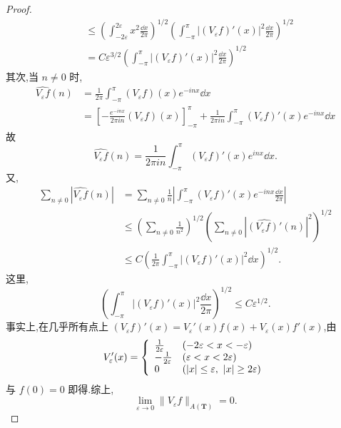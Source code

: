 \begin{proof}
\begin{align*}
& \leq \left(\int_{-2\varepsilon}^{2\varepsilon}x^{2}\frac{\dd x}{2\pi}\right)^{1/2}\left(\int_{-\pi}^{\pi}\left|(V_{\varepsilon}f)'(x)\right|^{2}\frac{\dd x}{2\pi}\right)^{1/2} \\
& = C\varepsilon^{3/2}\left(\int_{-\pi}^{\pi}\left|(V_{\varepsilon}f)'(x)\right|^{2}\frac{\dd x}{2\pi}\right)^{1/2}
\end{align*}
其次,当 $n \neq 0$ 时,
\begin{align*}
\widehat{V_{\varepsilon}f}(n) & = \frac{1}{2\pi}\int_{-\pi}^{\pi}(V_{\varepsilon}f)(x)e^{-inx}\dd x \\
& = \left[-\frac{e^{-inx}}{2\pi in}(V_{\varepsilon}f)(x)\right]_{-\pi}^{\pi} + \frac{1}{2\pi in}\int_{-\pi}^{\pi}(V_{\varepsilon}f)'(x)e^{-inx}\dd x
\end{align*}
故
\begin{equation*}
\widehat{V_{\varepsilon}f}(n) = \frac{1}{2\pi in}\int_{-\pi}^{\pi}(V_{\varepsilon}f)'(x)e^{inx}\dd x.
\end{equation*}
又,
\begin{align*}
\sum_{n \neq 0}\left|\widehat{V_{\varepsilon}f}(n)\right| & = \sum_{n \neq 0}\frac{1}{n}\left|\int_{-\pi}^{\pi}(V_{\varepsilon}f)'(x)e^{-inx}\frac{\dd x}{2\pi}\right| \\
& \leq \left(\sum_{n \neq 0}\frac{1}{n^{2}}\right)^{1/2}\left(\sum_{n \neq 0}\left|\widehat{(V_{\varepsilon}f)'}(n)\right|^{2}\right)^{1/2} \\
& \leq C\left(\frac{1}{2\pi}\int_{-\pi}^{\pi}\left|(V_{\varepsilon}f)'(x)\right|^{2}\dd x\right)^{1/2}.
\end{align*}
这里,
\begin{equation*}
\left(\int_{-\pi}^{\pi}\left|(V_{\varepsilon}f)'(x)\right|^{2}\frac{\dd x}{2\pi}\right)^{1/2} \leq C\varepsilon^{1/2}.
\end{equation*}
事实上,在几乎所有点上 $(V_{\varepsilon}f)'(x) = V_{\varepsilon}'(x)f(x) + V_{\varepsilon}(x)f'(x)$,由
\begin{equation*}
V_{\varepsilon}'(x) = \left\{\begin{array}{l l}
\frac{1}{2\varepsilon} & (-2\varepsilon < x < -\varepsilon) \\
-\frac{1}{2\varepsilon} & (\varepsilon < x < 2\varepsilon) \\
0 & (|x| \leq \varepsilon,\ |x| \geq 2\varepsilon)
\end{array}\right.
\end{equation*}
与 $f(0) = 0$ 即得.综上,
\begin{equation*}
\lim_{\varepsilon \to 0}\|V_{\varepsilon}f\|_{A(\mathbf{T})} = 0.

\end{equation*}
\end{proof}
